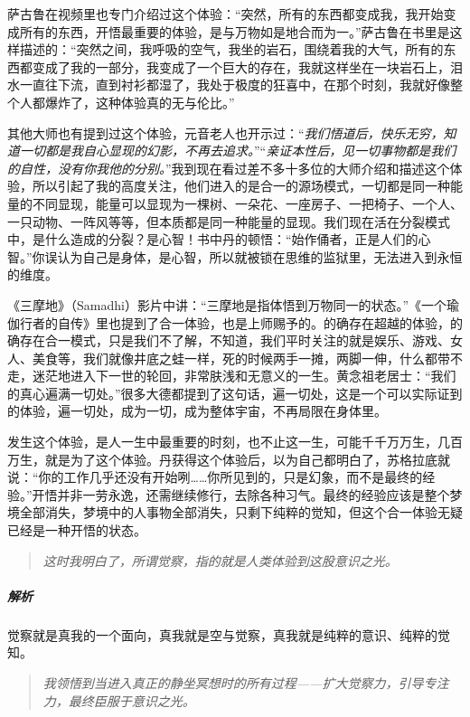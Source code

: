 萨古鲁在视频里也专门介绍过这个体验：“突然，所有的东西都变成我，我开始变成所有的东西，开悟最重要的体验，是与万物如是地合而为一。”萨古鲁在书里是这样描述的：“突然之间，我呼吸的空气，我坐的岩石，围绕着我的大气，所有的东西都变成了我的一部分，我变成了一个巨大的存在，我就这样坐在一块岩石上，泪水一直往下流，直到衬衫都湿了，我处于极度的狂喜中，在那个时刻，我就好像整个人都爆炸了，这种体验真的无与伦比。”

其他大师也有提到过这个体验，元音老人也开示过：“\textit{我们悟道后，快乐无穷，知道一切都是我自心显现的幻影，不再去追求。}”“\textit{亲证本性后，见一切事物都是我们的自性，没有你我他的分别。}”我到现在看过差不多十多位的大师介绍和描述这个体验，所以引起了我的高度关注，他们进入的是合一的源场模式，一切都是同一种能量的不同显现，能量可以显现为一棵树、一朵花、一座房子、一把椅子、一个人、一只动物、一阵风等等，但本质都是同一种能量的显现。我们现在活在分裂模式中，是什么造成的分裂？是心智！书中丹的顿悟：“始作俑者，正是人们的心智。”你误认为自己是身体，是心智，所以就被锁在思维的监狱里，无法进入到永恒的维度。

《三摩地》（Samadhi）影片中讲：“三摩地是指体悟到万物同一的状态。”《一个瑜伽行者的自传》里也提到了合一体验，也是上师赐予的。的确存在超越的体验，的确存在合一模式，只是我们不了解，不知道，我们平时关注的就是娱乐、游戏、女人、美食等，我们就像井底之蛙一样，死的时候两手一摊，两脚一伸，什么都带不走，迷茫地进入下一世的轮回，非常肤浅和无意义的一生。黄念祖老居士：“我们的真心遍满一切处。”很多大德都提到了这句话，遍一切处，这是一个可以实际证到的体验，遍一切处，成为一切，成为整体宇宙，不再局限在身体里。

发生这个体验，是人一生中最重要的时刻，也不止这一生，可能千千万万生，几百万生，就是为了这个体验。丹获得这个体验后，以为自己都明白了，苏格拉底就说：“你的工作几乎还没有开始咧……你所见到的，只是幻象，而不是最终的经验。”开悟并非一劳永逸，还需继续修行，去除各种习气。最终的经验应该是整个梦境全部消失，梦境中的人事物全部消失，只剩下纯粹的觉知，但这个合一体验无疑已经是一种开悟的状态。

\begin{quote}\it
    这时我明白了，所谓觉察，指的就是人类体验到这股意识之光。
\end{quote}

\subparagraph{解析} 觉察就是真我的一个面向，真我就是空与觉察，真我就是纯粹的意识、纯粹的觉知。

\begin{quote}\it
    我领悟到当进入真正的静坐冥想时的所有过程——扩大觉察力，引导专注力，最终臣服于意识之光。
\end{quote}

